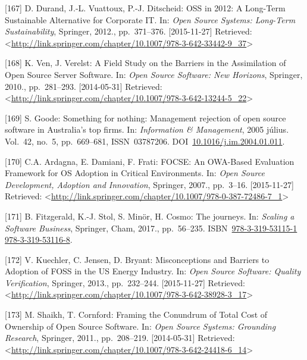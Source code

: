 \documentclass[12pt,magyar,a4paper,oneside]{scrreprt}
\begin{document}
\leavevmode\hypertarget{ref-durand_oss_2012}{}%
{[}167{]} D. Durand, J.-L. Vuattoux, P.-J. Ditscheid: OSS in 2012: A
Long-Term Sustainable Alternative for Corporate IT. In: \emph{Open
Source Systems: Long-Term Sustainability}, Springer, 2012.,
pp.~371--376. {[}2015-11-27{]} Retrieved:
\textless{}\url{http://link.springer.com/chapter/10.1007/978-3-642-33442-9_37}\textgreater{}

\leavevmode\hypertarget{ref-ven_field_2010}{}%
{[}168{]} K. Ven, J. Verelst: A Field Study on the Barriers in the
Assimilation of Open Source Server Software. In: \emph{Open Source
Software: New Horizons}, Springer, 2010., pp.~281--293. {[}2014-05-31{]}
Retrieved:
\textless{}\url{http://link.springer.com/chapter/10.1007/978-3-642-13244-5_22}\textgreater{}

\leavevmode\hypertarget{ref-goode_something_2005}{}%
{[}169{]} S. Goode: Something for nothing: Management rejection of open
source software in Australia's top firms. In: \emph{Information \&
Management}, 2005 július. Vol.~42, no.~5, pp.~669--681, ISSN~03787206.
DOI~\href{https://doi.org/10.1016/j.im.2004.01.011}{10.1016/j.im.2004.01.011}.

\leavevmode\hypertarget{ref-ardagna_focse_2007}{}%
{[}170{]} C.A. Ardagna, E. Damiani, F. Frati: FOCSE: An OWA-Based
Evaluation Framework for OS Adoption in Critical Environments. In:
\emph{Open Source Development, Adoption and Innovation}, Springer,
2007., pp.~3--16. {[}2015-11-27{]} Retrieved:
\textless{}\url{http://link.springer.com/chapter/10.1007/978-0-387-72486-7_1}\textgreater{}

\leavevmode\hypertarget{ref-fitzgerald_journeys_2017}{}%
{[}171{]} B. Fitzgerald, K.-J. Stol, S. Minör, H. Cosmo: The journeys.
In: \emph{Scaling a Software Business}, Springer, Cham, 2017.,
pp.~56--235.
ISBN~\href{https://worldcat.org/isbn/978-3-319-53115-1\%20978-3-319-53116-8}{978-3-319-53115-1 978-3-319-53116-8}.

\leavevmode\hypertarget{ref-kuechler_misconceptions_2013}{}%
{[}172{]} V. Kuechler, C. Jensen, D. Bryant: Misconceptions and Barriers
to Adoption of FOSS in the US Energy Industry. In: \emph{Open Source
Software: Quality Verification}, Springer, 2013., pp.~232--244.
{[}2015-11-27{]} Retrieved:
\textless{}\url{http://link.springer.com/chapter/10.1007/978-3-642-38928-3_17}\textgreater{}

\leavevmode\hypertarget{ref-shaikh_framing_2011}{}%
{[}173{]} M. Shaikh, T. Cornford: Framing the Conundrum of Total Cost of
Ownership of Open Source Software. In: \emph{Open Source Systems:
Grounding Research}, Springer, 2011., pp.~208--219. {[}2014-05-31{]}
Retrieved:
\textless{}\url{http://link.springer.com/chapter/10.1007/978-3-642-24418-6_14}\textgreater{}
\end{document}
